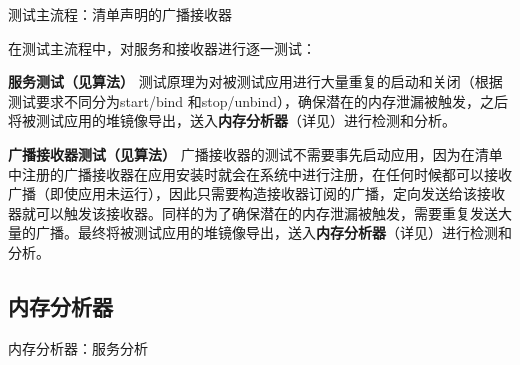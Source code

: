 \begin{algorithm}
	\caption{测试主流程：清单声明的广播接收器}
	\label{alg:receiver}
	\begin{algorithmic}[1]
			\ENDWHILE
		\ENDFOR
	\end{algorithmic}
\end{algorithm}

在测试主流程中，对服务和接收器进行逐一测试：

\textbf{服务测试（见算法\redbf{\ref{alg:service}}） }  测试原理为对被测试应用进行大量重复的启动和关闭（根据测试要求不同分为start/bind 和stop/unbind），确保潜在的内存泄漏被触发，之后将被测试应用的堆镜像导出，送入\textbf{内存分析器}（详见\redbf{\ref{memory analyser}}）进行检测和分析。

\textbf{广播接收器测试（见算法\redbf{\ref{alg:receiver}}） }
广播接收器的测试不需要事先启动应用，因为在清单中注册的广播接收器在应用安装时就会在系统中进行注册，在任何时候都可以接收广播（即使应用未运行），因此只需要构造接收器订阅的广播，定向发送给该接收器就可以触发该接收器。同样的为了确保潜在的内存泄漏被触发，需要重复发送大量的广播。最终将被测试应用的堆镜像导出，送入\textbf{内存分析器}（详见\redbf{\ref{memory analyser}}）进行检测和分析。
\subsection{内存分析器}\label{memory analyser}

\begin{algorithm}
	\caption{内存分析器：服务分析}
	\label{alg:memory analyser:service}
	\begin{algorithmic}[1]
					\ELSE
					\ENDIF
				\ENDIF
			\ENDIF
		\ENDFOR
	\end{algorithmic}
\end{algorithm}


